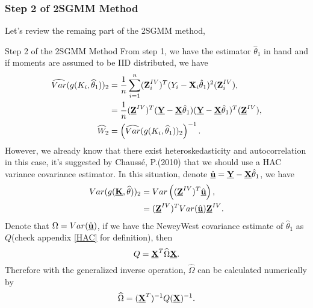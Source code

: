 \documentclass{article}
\theoremstyle{definition}
\begin{document}
\subsubsection{Step 2 of 2SGMM Method}\label{2SGMM}
Let's review the remaing part of the 2SGMM method,
\begin{itembox}[1]{{\color{blue} Step 2 of the 2SGMM Method}}
From step 1, we have the estimator $\hat{\theta}_1$ in hand and if moments are assumed to be IID distributed, we have
\begin{align*}
	\widehat{Var}(g(K_i, \widehat{\theta}_1))_2 
	& = \frac{1}{n}\sum_{i=1}^{n}(\textbf{Z}_{i}^{IV})^T (Y_i - \textbf{X}_i \hat{\theta}_1)^2 (\textbf{Z}_{i}^{IV}),\\
	& = \frac{1}{n} (\textbf{\underline{Z}}^{IV})^T (\textbf{\underline{Y}} - \textbf{\underline{X}} \hat{\theta}_1) (\textbf{\underline{Y}} - \textbf{\underline{X}} \hat{\theta}_1)^T (\textbf{\underline{Z}}^{IV}),\\
	\widehat{W}_2 & = \left(\widehat{Var}(g(K_i, \widehat{\theta}_1))_2 \right)^{-1}.
\end{align*}
However, we already know that there exist heteroskedasticity and autocorrelation in this case, it's suggested by Chaussé, P.(2010)\cite{gmmR} that we should use a HAC variance covariance estimator. In this situation, denote $\hat{\textbf{\underline{u}}} = \textbf{\underline{Y}} - \textbf{\underline{X}} \hat{\theta}_1$, we have\\
\begin{align*}
	Var(g(\textbf{\underline{K}}, \widehat{\theta}))_2 
	& = Var\left((\textbf{\underline{Z}}^{IV})^T \hat{\textbf{\underline{u}}} \right),\\
	& = (\textbf{\underline{Z}}^{IV})^T Var(\hat{\textbf{\underline{u}}}) \textbf{\underline{Z}}^{IV}.
\end{align*}
Denote that $\Omega = Var(\hat{\textbf{\underline{u}}})$, if we have the NeweyWest covariance estimate of $\hat{\theta}_1$ as $Q$(check appendix \ref{HAC} for definition), then\\
\begin{equation*}
	Q = \textbf{\underline{X}}^T \widehat{\Omega} \textbf{\underline{X}}.
\end{equation*}
Therefore with the generalized inverse operation, $\widehat{\Omega}$ can be calculated numerically by\\
\begin{equation*}
	\widehat{\Omega} = (\textbf{\underline{X}}^T)^{-1} Q (\textbf{\underline{X}})^{-1}.
\end{equation*}

\end{itembox}
\end{document}
